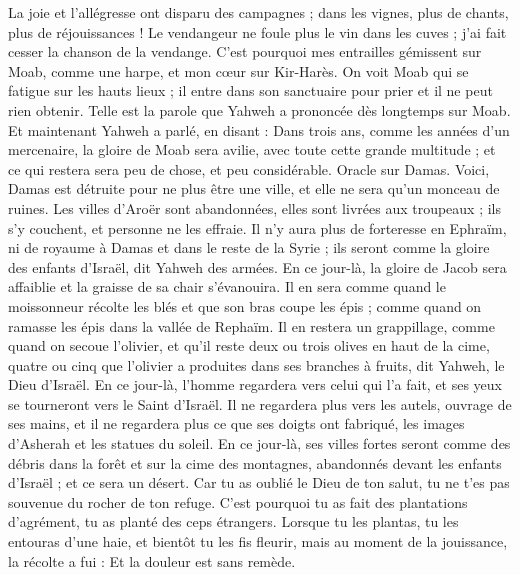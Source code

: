 \begin{multicols}{2}
La joie et l'allégresse ont disparu des campagnes ; dans les vignes, plus de chants, plus de réjouissances ! Le vendangeur ne foule plus le vin dans les cuves ; j'ai fait cesser la chanson de la vendange.
C'est pourquoi mes entrailles gémissent sur Moab, comme une harpe, et mon cœur sur Kir-Harès.
On voit Moab qui se fatigue sur les hauts lieux ; il entre dans son sanctuaire pour prier et il ne peut rien obtenir.
Telle est la parole que Yahweh a prononcée dès longtemps sur Moab.
Et maintenant Yahweh a parlé, en disant : Dans trois ans, comme les années d'un mercenaire, la gloire de Moab sera avilie, avec toute cette grande multitude ; et ce qui restera sera peu de chose, et peu considérable.
\VerseOne{}Oracle sur Damas. Voici, Damas est détruite pour ne plus être une ville, et elle ne sera qu'un monceau de ruines.
Les villes d'Aroër sont abandonnées, elles sont livrées aux troupeaux ; ils s'y couchent, et personne ne les effraie.
Il n'y aura plus de forteresse en Ephraïm, ni de royaume à Damas et dans le reste de la Syrie ; ils seront comme la gloire des enfants d'Israël, dit Yahweh des armées.
En ce jour-là, la gloire de Jacob sera affaiblie et la graisse de sa chair s'évanouira.
Il en sera comme quand le moissonneur récolte les blés et que son bras coupe les épis ; comme quand on ramasse les épis dans la vallée de Rephaïm.
Il en restera un grappillage, comme quand on secoue l'olivier, et qu'il reste deux ou trois olives en haut de la cime, quatre ou cinq que l'olivier a produites dans ses branches à fruits, dit Yahweh, le Dieu d'Israël.
En ce jour-là, l'homme regardera vers celui qui l'a fait, et ses yeux se tourneront vers le Saint d'Israël.
Il ne regardera plus vers les autels, ouvrage de ses mains, et il ne regardera plus ce que ses doigts ont fabriqué, les images d'Asherah et les statues du soleil.
En ce jour-là, ses villes fortes seront comme des débris dans la forêt et sur la cime des montagnes, abandonnés devant les enfants d'Israël ; et ce sera un désert.
Car tu as oublié le Dieu de ton salut, tu ne t'es pas souvenue du rocher de ton refuge. C'est pourquoi tu as fait des plantations d'agrément, tu as planté des ceps étrangers.
Lorsque tu les plantas, tu les entouras d'une haie, et bientôt tu les fis fleurir, mais au moment de la jouissance, la récolte a fui : Et la douleur est sans remède.

\end{multicols}
